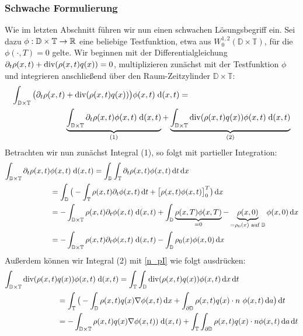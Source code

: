 \subsubsection{Schwache Formulierung}
Wie im letzten Abschnitt führen wir nun einen schwachen Lösungsbegriff ein. Sei dazu $ \phi : \mathbb{D} \times \mathbb{T} \to \mathbb{R} $ eine beliebige Testfunktion, etwa aus  $W_0^{1,2}(\mathbb{D} \times \mathbb{T}) $, für die $ \phi(\cdot,T) = 0 $ gelte. 
Wir beginnen mit der Differentialgleichung $ \partial_t \rho(x,t) + \operatorname{div}(\rho(x,t) q(x)) = 0  $, multiplizieren zunächst mit der Testfunktion $ \phi $ und integrieren anschließend über den Raum-Zeitzylinder $ \mathbb{D} \times \mathbb{T} $:
\begin{align*}
	\int_{\mathbb{D} \times \mathbb{T}} \big(\partial_t \rho(x,t) &+ \operatorname{div}(\rho(x,t) q(x) ) \big) \phi(x,t) \; \mathrm{d} (x,t) =  \\
	&\underbrace{\int_{\mathbb{D} \times \mathbb{T}}  \partial_t \rho(x,t) \phi(x,t) \; \mathrm{d} (x,t)}_{(1)} +\underbrace{\int_{\mathbb{D} \times \mathbb{T}}  
    \operatorname{div}(\rho(x,t) q(x) ) \phi(x,t)\; \mathrm{d} (x,t)}_{(2)}
\end{align*}
Betrachten wir nun zunächst Integral (1), so folgt mit partieller Integration:
\begin{align*}
	\int_{\mathbb{D} \times \mathbb{T}}  \partial_t \rho(x,t) &\phi(x,t) \; \mathrm{d} (x,t) = \int_{\mathbb{D}} \int_{\mathbb{T}} \partial_t \rho(x,t) \phi(x,t) \, \mathrm{d} t \, \mathrm{d} x \\&= \int_{\mathbb{D}} \big( - \int_{\mathbb{T}} \rho(x,t) \partial_t \phi(x,t) \, \mathrm{d} t + \big[ \rho(x,t) \phi(x,t) \big]_0^T  \big) \, \mathrm{d} x \\
	&= - \int_{\mathbb{D} \times \mathbb{T}} \rho(x,t) \partial_t \phi(x,t) \; \mathrm{d} (x,t) + \int_{\mathbb{D}} \underbrace{\rho(x,T) \phi(x,T)}_{ = 0 } - \underbrace{\rho(x,0)}_{ = \rho_0(x) \text{ auf } \mathbb{D}} \phi(x,0)  \, \mathrm{d} x\\
	&= - \int_{\mathbb{D} \times \mathbb{T}} \rho(x,t) \partial_t \phi(x,t) \; \mathrm{d} (x,t) - \int_{\mathbb{D}} \rho_0(x) \phi(x,0) \, \mathrm{d} x 
\end{align*}
Außerdem können wir Integral (2) mit  \ref{n_pI} wie folgt ausdrücken:
\begin{align*}
	\int_{\mathbb{D} \times \mathbb{T}}  
	\operatorname{div}(\rho(x,t) &q(x) ) \phi(x,t)\; \mathrm{d} (x,t) = \int_{\mathbb{T}} \int_{\mathbb{D}} \operatorname{div}(\rho(x,t) q(x) ) \phi(x,t) \, \mathrm{d} x \, \mathrm{d} t \\
	&= \int_{\mathbb{T}} \big( - \int_{\mathbb{D}} \rho(x,t) q(x) \nabla \phi(x,t) \, \mathrm{d} x + \int_{\partial \mathbb{D}} \rho(x,t) q(x) \cdot n \ \phi(x,t) \, \mathrm{d} a \big)  \, \mathrm{d} t \\
	&= - \int_{\mathbb{D} \times \mathbb{T}} \rho(x,t) q(x) \nabla \phi(x,t)) \; \mathrm{d} (x,t) + \int_{\mathbb{T}} \int_{\partial \mathbb{D}} \rho(x,t) q(x) \cdot n \phi(x,t) \, \mathrm{d} a \, \mathrm{d} t 
\end{align*}
